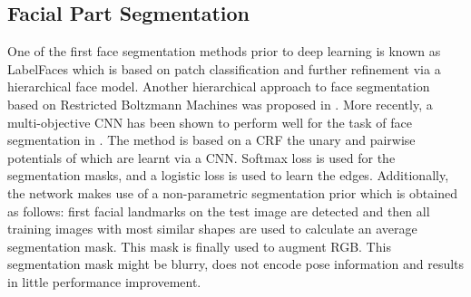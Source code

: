 \subsection{Facial Part Segmentation}

One of the first face segmentation methods
prior to deep learning is known as LabelFaces
\cite{warrell2009labelfaces} which is based on patch classification
and further refinement via a hierarchical face model. Another
hierarchical approach to face segmentation based on Restricted
Boltzmann Machines was proposed in \cite{luo2012hierarchical}. More
recently, a multi-objective CNN has been shown to perform well for the
task of face segmentation in \cite{liu2015multi}. The method is based
on a CRF the unary and pairwise potentials of which are learnt via a
CNN. Softmax loss is used for the segmentation masks, and a logistic
loss is used to learn the edges. Additionally, the network makes use
of a non-parametric segmentation prior which is obtained as follows:
first facial landmarks on the test image are detected and then all
training images with most similar shapes are used to calculate an
average segmentation mask. This mask is finally used to augment
RGB. This segmentation mask might be blurry, does not encode pose
information and results in little performance improvement.











